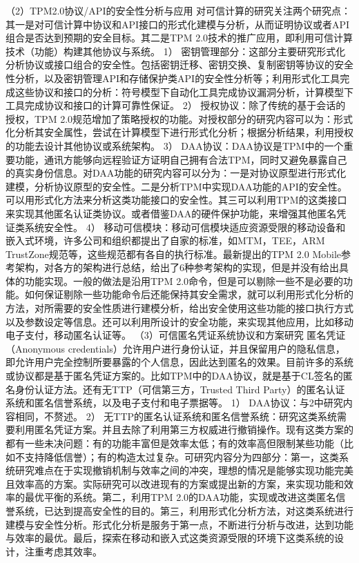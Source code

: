 （2）TPM2.0协议/API的安全性分析与应用
对可信计算的研究关注两个研究点：其一是对可信计算中协议和API接口的形式化建模与分析，从而证明协议或者API组合是否达到预期的安全目标。其二是TPM 2.0技术的推广应用，即利用可信计算技术（功能）构建其他协议与系统。 
1）	密钥管理部分：这部分主要研究形式化分析协议或接口组合的安全性。包括密钥迁移、密钥交换、复制密钥等协议的安全性分析，以及密钥管理API和存储保护类API的安全性分析等；利用形式化工具完成这些协议和接口的分析：符号模型下自动化工具完成协议漏洞分析，计算模型下工具完成协议和接口的计算可靠性保证。
2）	授权协议：除了传统的基于会话的授权，TPM 2.0规范增加了策略授权的功能。对授权部分的研究内容可以为：形式化分析其安全属性，尝试在计算模型下进行形式化分析；根据分析结果，利用授权的功能去设计其他协议或系统架构。
3）	DAA协议：DAA协议是TPM中的一个重要功能，通讯方能够向远程验证方证明自己拥有合法TPM，同时又避免暴露自己的真实身份信息。对DAA功能的研究内容可以分为：一是对协议原型进行形式化建模，分析协议原型的安全性。二是分析TPM中实现DAA功能的API的安全性。可以用形式化方法来分析这类功能接口的安全性。其三可以利用TPM的这类接口来实现其他匿名认证类协议。或者借鉴DAA的硬件保护功能，来增强其他匿名凭证类系统安全性。
4）	移动可信模块：移动可信模块适应资源受限的移动设备和嵌入式环境，许多公司和组织都提出了自家的标准，如MTM，TEE，ARM TrustZone规范等，这些规范都有各自的执行标准。最新提出的TPM 2.0 Mobile参考架构，对各方的架构进行总结，给出了6种参考架构的实现，但是并没有给出具体的功能实现。一般的做法是沿用TPM 2.0命令，但是可以剔除一些不是必要的功能。如何保证剔除一些功能命令后还能保持其安全需求，就可以利用形式化分析的方法，对所需要的安全性质进行建模分析，给出安全使用这些功能的接口执行方式以及参数设定等信息。还可以利用所设计的安全功能，来实现其他应用，比如移动电子支付，移动匿名认证等。
（3）可信匿名凭证系统协议和方案研究
匿名凭证（Anonymous credentials）允许用户进行身份认证，并且保留用户的隐私信息，即允许用户完全控制所要暴露的个人信息，因此达到匿名的效果。目前许多的系统或协议都是基于匿名凭证方案的。比如TPM中的DAA协议，就是基于CL签名的匿名身份认证方法。还有无TTP（可信第三方，Trusted Third Party）的匿名认证系统和匿名信誉系统，以及电子支付和电子票据等。
1）	DAA协议：与2中研究内容相同，不赘述。
2）	无TTP的匿名认证系统和匿名信誉系统：研究这类系统需要利用匿名凭证方案。并且去除了利用第三方权威进行撤销操作。现有这类方案的都有一些未决问题：有的功能丰富但是效率太低；有的效率高但限制某些功能（比如不支持降低信誉）；有的构造太过复杂。可研究内容分为四部分：第一，这类系统研究难点在于实现撤销机制与效率之间的冲突，理想的情况是能够实现功能完美且效率高的方案。实际研究可以改进现有的方案或提出新的方案，来实现功能和效率的最优平衡的系统。第二，利用TPM 2.0的DAA功能，实现或改进这类匿名信誉系统，已达到提高安全性的目的。第三，利用形式化分析方法，对这类系统进行建模与安全性分析。形式化分析是服务于第一点，不断进行分析与改进，达到功能与效率的最优。最后，探索在移动和嵌入式这类资源受限的环境下这类系统的设计，注重考虑其效率。
